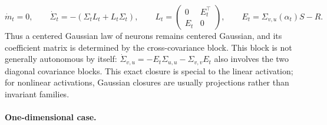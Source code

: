\begin{example}
	\[
		\dot m_t=0,
		\qquad
		\dot\Sigma_t=-(\Sigma_t L_t+L_t\Sigma_t),
		\qquad
		L_t=
		\begin{pmatrix}
			0 & E_t^\top\\
			E_t & 0
		\end{pmatrix},
		\qquad
		E_t=\Sigma_{v,u}(\alpha_t)S-R.
	\]
	Thus a centered Gaussian law of neurons remains centered Gaussian, and its coefficient matrix is determined by the cross-covariance block. This block is not generally autonomous by itself: $\dot\Sigma_{v,u}=-E_t\Sigma_{u,u}-\Sigma_{v,v}E_t$ also involves the two diagonal covariance blocks. This exact closure is special to the linear activation; for nonlinear activations, Gaussian closures are usually projections rather than invariant families.
\end{example}

\paragraph{One-dimensional case.}

